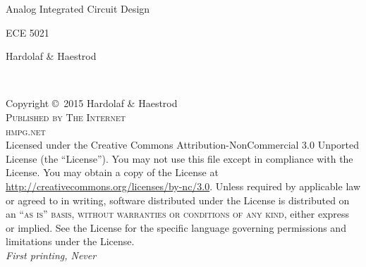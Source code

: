 \documentclass[11pt,fleqn]{book} %
\begin{document}

\begingroup
\thispagestyle{empty}
\centering
\vspace*{9cm}
\par\normalfont\fontsize{35}{35}\sffamily\selectfont
Analog Integrated Circuit Design\par %
\normalfont\fontsize{30}{30}\sffamily\selectfont
ECE 5021\par
\vspace*{1cm}
{\Huge Hardolaf \& Haestrod}\par %
\endgroup


\newpage
~\vfill
\thispagestyle{empty}

\noindent Copyright \copyright\ 2015 Hardolaf \& Haestrod\\ %

\noindent \textsc{Published by The Internet}\\ %

\noindent \textsc{hmpg.net}\\ %

\noindent Licensed under the Creative Commons Attribution-NonCommercial 3.0 Unported License (the ``License''). You may not use this file except in compliance with the License. You may obtain a copy of the License at \url{http://creativecommons.org/licenses/by-nc/3.0}. Unless required by applicable law or agreed to in writing, software distributed under the License is distributed on an \textsc{``as is'' basis, without warranties or conditions of any kind}, either express or implied. See the License for the specific language governing permissions and limitations under the License.\\ %

\noindent \textit{First printing, Never} %

\end{document}

